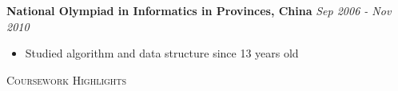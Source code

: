\documentclass[a4paper, 12pt]{article}
\newenvironment{changemargin}[2]{%
  \begin{list}{}{%
      \setlength{\topsep}{0pt}%
      \setlength{\leftmargin}{#1}%
      \setlength{\rightmargin}{#2}%
      \setlength{\listparindent}{\parindent}%
      \setlength{\itemindent}{\parindent}%
      \setlength{\parsep}{\parskip}%
    }%
  \item[]}{\end{list}
}
\newcommand{\lineover}{
  \begin{changemargin}{-0.05in}{-0.05in}
    \vspace*{-8pt}
    \hrulefill \\
    \vspace*{-2pt}
  \end{changemargin}
}
\newcommand{\header}[1]{
  \begin{changemargin}{-0.6in}{-0.6in}
    \fontsize{15}{15}\scshape{#1}\\
    \lineover
    \vspace*{-4pt}
  \end{changemargin}
}
\newenvironment{body}
{
\vspace*{-16pt}
\begin{changemargin}{-0.25in}{-0.5in}
}
{
\end{changemargin}
}
\begin{document}
\begin{body}
  \textbf{National Olympiad in Informatics in Provinces, China} \hfill \emph{Sep 2006 - Nov 2010}\\
  \vspace*{-6pt}
  \begin{itemize} \itemsep -0pt \small
  \item Studied algorithm and data structure since 13 years old
  \end{itemize}
\end{body}

%
%
%
%
\header{Coursework Highlights}
\end{document}
